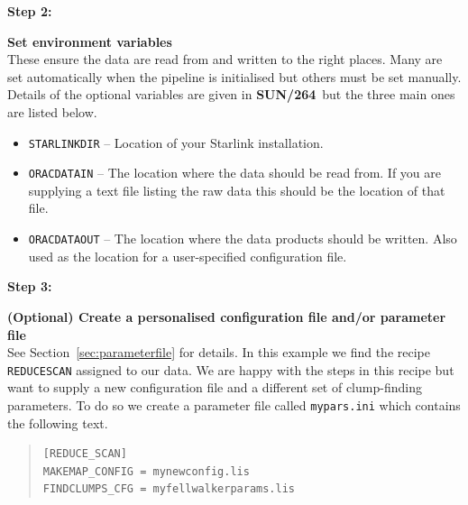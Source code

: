 \documentclass[twoside,11pt]{article}
\newcommand{\htmlref}[2]{#1}
\newcommand{\latexhtml}[2]{#1}
\newcommand{\xref}[3]{#1}
\renewcommand{\_}{\texttt{\symbol{95}}}
\newcommand{\drrecipe}[1]{\texttt{#1}}
\newcommand{\envvar}[1]{\texttt{#1}}
\newcommand{\file}[1]{\texttt{#1}}
\newcommand{\pipelinesun}{\xref{\textbf{SUN/264}}{sun264}{}}
\newcommand{\cref}[3]{\latexhtml{#1~\ref{#2}}{\htmlref{#3}{#2}}}
\begin{document}
\begin{minipage}[t]{0.12\linewidth}
\textbf{Step 2:}
\end{minipage}
\begin{minipage}[t]{0.87\linewidth}
\textbf{Set environment variables} \\These ensure the data are read
from and written to the right places. Many are set automatically when
the pipeline is initialised but others must be set manually. Details
of the optional variables are given in \pipelinesun\ but the three
main ones are listed below.
\begin{itemize}\itemsep-0.1em
\item \envvar{STARLINK\_DIR} -- Location of your Starlink installation.
\item \envvar{ORAC\_DATA\_IN} -- The location where the data should be read from.
If you are supplying a text file listing the raw data this should be the
location of that file.
\item \envvar{ORAC\_DATA\_OUT} -- The location where the data products should be
written. Also used as the location for a user-specified configuration file.\\
\end{itemize}
\end{minipage}

\begin{minipage}[t]{0.12\linewidth}
\textbf{Step 3:}
\end{minipage}
\begin{minipage}[t]{0.87\linewidth}
\textbf{(Optional) Create a personalised configuration file and/or parameter file} \\
See \cref{Section}{sec:parameterfile}{Changing the defaults} for
details. In this example we find the recipe \drrecipe{REDUCE\_SCAN}
assigned to our data. We are happy with the steps in this recipe but
want to supply a new configuration file and a different set of
clump-finding parameters. To do so we create a parameter file called
\file{mypars.ini} which contains the following text.

\begin{quote}
\begin{verbatim}
[REDUCE_SCAN]
MAKEMAP_CONFIG = mynewconfig.lis
FINDCLUMPS_CFG = myfellwalkerparams.lis

\end{verbatim}
\end{quote}

\end{minipage}
\end{document}
